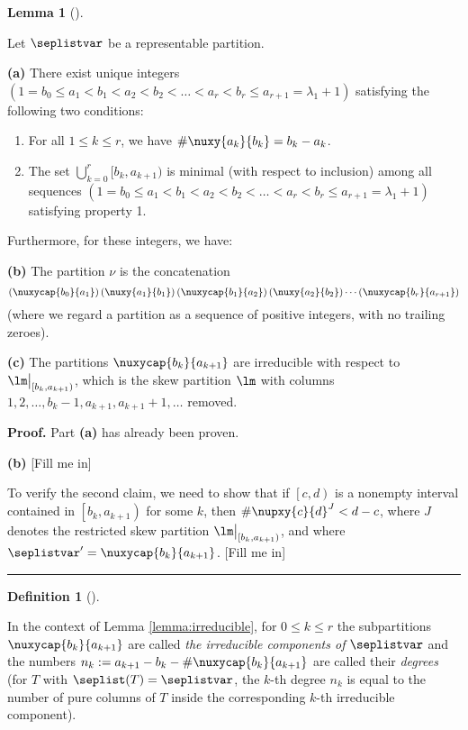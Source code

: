 \documentclass[numbers=enddot,12pt,final,onecolumn,notitlepage]{scrartcl}%
\theoremstyle{definition}
\newtheorem{lem}[theo]{Lemma}
\newenvironment{lemma}[1][]
{\begin{lem}[#1]\begin{leftbar}}
{\end{leftbar}\end{lem}}
\newtheorem{defi}[theo]{Definition}
\newenvironment{definition}[1][]
{\begin{defi}[#1]\begin{leftbar}}
{\end{leftbar}\end{defi}}
\newtheorem{remk}[theo]{Remark}
\newenvironment{remark}[1][]
{\begin{remk}[#1]\begin{leftbar}}
{\end{leftbar}\end{remk}}
\newenvironment{proof}[1][Proof]{\noindent\textbf{#1.} }{\ \rule{0.5em}{0.5em}}
\begin{document}
\begin{lemma}
\label{lemma:irreducible}
 Let $\seplistvar$ be a representable partition.

\textbf{(a)} There exist unique integers $(1=b_0\leq a_1<b_1<a_2<b_2<\dots<a_r<b_r\leq a_{r+1}=\lambda_1+1)$ satisfying the following two conditions:
 \begin{enumerate}
  \item For all $1\leq k\leq r$, we have $\#\nuxy{a_k}{b_k} =b_k-a_k$.
  \item The set $\bigcup_{k=0}^{r}[b_k,a_{k+1})$ is minimal (with respect to inclusion) among all sequences $(1=b_0\leq a_1<b_1<a_2<b_2<\dots<a_r<b_r\leq a_{r+1}=\lambda_1+1)$ satisfying property 1.
 \end{enumerate}

Furthermore, for these integers, we have:

\textbf{(b)} The partition $\nu$ is the concatenation
\[
\left(\nuxycap{b_0}{a_1}\right) \left(\nuxy{a_1}{b_1}\right) \left(\nuxycap{b_1}{a_2}\right) \left(\nuxy{a_2}{b_2}\right) \cdots \left(\nuxycap{b_r}{a_{r+1}}\right)
\]
(where we regard a partition as a sequence of positive integers, with no trailing zeroes).

\textbf{(c)} The partitions $\nuxycap{b_k}{a_{k+1}}$ are irreducible with respect to $\lm\big|_{[b_k,a_{k+1})}$,
 which is the skew partition $\lm$ with columns $1,2,\dots,b_k-1,a_{k+1},a_{k+1}+1,\dots$ removed.
\end{lemma}

\begin{proof}
Part \textbf{(a)} has already been proven.

\textbf{(b)} [Fill me in]

To verify the second claim, we need to show that if $\left[c,d\right)$ is a nonempty interval contained in $\left[b_k, a_{k+1}\right)$ for some $k$, then $\#\nupxy{c}{d}^{J} < d-c$, where $J$ denotes the restricted skew partition $\lm\big|_{[b_k,a_{k+1})}$, and where $\seplistvar^{\prime} = \nuxycap{b_k}{a_{k+1}}$.
[Fill me in]
\end{proof}

\begin{definition}
 
 In the context of Lemma \ref{lemma:irreducible}, for $0\leq k\leq r$ the subpartitions $\nuxycap{b_k}{a_{k+1}}$ are called \textit{the irreducible components of $\seplistvar$} and the numbers $n_k:=a_{k+1}-b_k-\#\nuxycap{b_k}{a_{k+1}}$ are called their \textit{degrees}  (for $T$ with $\seplist(T)=\seplistvar$, the $k$-th degree $n_k$ is equal to the number of pure columns of $T$ inside the corresponding $k$-th irreducible component).
\end{definition}
\end{document}
